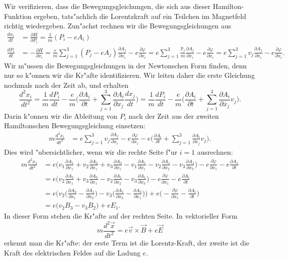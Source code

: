Wir verifizieren, dass die Bewegungsgleichungen, die sich aus dieser
Hamilton-Funktion ergeben, tats"achlich die Lorentzkraft auf ein
Teilchen im Magnetfeld richtig wiedergeben.
Zun"achst rechnen wir die Bewegungsgleichungen aus
\begin{align*}
\frac{dx_i}{dt}
&=
\frac{\partial H}{\partial P_i}
=
\frac1m(P_i-eA_i)
\\
\frac{dP_i}{dt}
&=
-\frac{\partial H}{\partial x_i}
=
\frac{e}{m}\sum_{j=1}^3( P_j-eA_j)\frac{\partial A_j}{\partial x_i}
-e\frac{\partial\varphi}{\partial x_i}
=
e\sum_{j=1}^3\frac{p_j}{m}\frac{\partial A_j}{\partial x_i}
-e\frac{\partial\varphi}{\partial x_i}
=
e\sum_{j=1}^3v_j\frac{\partial A_j}{\partial x_i}
-e\frac{\partial\varphi}{\partial x_i}.
\end{align*}
Wir m"ussen die Bewegungsgleichungen in der Newtonschen Form 
finden, denn nur so k"onnen wir die Kr"afte identifizieren.
Wir leiten daher die erste Gleichung nochmals nach der Zeit ab,
und erhalten
\[
\frac{d^2 x_i}{dt^2}
=
\frac1m\frac{dP_i}{dt}-\frac{e}{m}\biggl(
\frac{\partial A_i}{\partial t}
+\sum_{j=1}^3\frac{\partial A_i}{\partial x_j}\frac{dx_j}{dt}
\biggr)
=
\frac1m\frac{dP_i}{dt}-\frac{e}{m}\biggl(
\frac{\partial A_i}{\partial t}
+
\sum_{j=1}^3\frac{\partial A_i}{\partial x_j}v_j
\biggr).
\]
Darin k"onnen wir die Ableitung von $P_i$ nach der Zeit aus der
zweiten Hamiltonschen Bewegungsgleichung einsetzen:
\begin{align*}
m\frac{d^2 x_i}{dt^2}
&=
e\sum_{j=1}^3v_j\frac{\partial A_j}{\partial x_i}
-e\frac{\partial\varphi}{\partial x_i}
-
e\biggl(
\frac{\partial A_i}{\partial t}
+\sum_{j=1}^3\frac{\partial A_i}{\partial x_j}v_j
\biggr).
\end{align*}
Dies wird "ubersichtlicher, wenn wir die rechte Seite f"ur $i=1$
ausrechnen:
\begin{align*}
m\frac{d^2 x_1}{dt^2}
&=
e\biggl(
v_1\frac{\partial A_1}{\partial x_1}
+
v_2\frac{\partial A_2}{\partial x_1}
+
v_3\frac{\partial A_3}{\partial x_1}
-
v_1\frac{\partial A_1}{\partial x_1}
-
v_2\frac{\partial A_1}{\partial x_2}
-
v_3\frac{\partial A_1}{\partial x_3}
\biggr)
-e\frac{\partial\varphi}{\partial x_1}
-e\frac{\partial A_1}{\partial t}
\\
&=
e\biggl(
v_2\frac{\partial A_2}{\partial x_1}
+
v_3\frac{\partial A_3}{\partial x_1}
-
v_2\frac{\partial A_1}{\partial x_2}
-
v_3\frac{\partial A_1}{\partial x_3}
\biggr)
-e\frac{\partial\varphi}{\partial x_1}
-e\frac{\partial A_i}{\partial t}
\\
&=
e\biggl(
v_2
\biggl(
\frac{\partial A_2}{\partial x_1}
-
\frac{\partial A_1}{\partial x_2}
\biggr)
-
v_3\biggr(
\frac{\partial A_1}{\partial x_3}
-
\frac{\partial A_3}{\partial x_1}
\biggr)
\biggr)
+e\biggl(
-\frac{\partial\varphi}{\partial x_1}
-\frac{\partial A_i}{\partial t}
\biggr)
\\
&=
e\biggl(
v_2B_3
-
v_3B_2
\biggr)
+eE_1.
\end{align*}
In dieser Form stehen die Kr"afte auf der rechten Seite. 
In vektorieller Form
\[
m\frac{d^2\vec x}{dt^2}
=
e\vec v\times\vec B
+e\vec E
\]
erkennt man die Kr"afte: der erste Term ist die Lorentz-Kraft,
der zweite ist die Kraft des elektrischen Feldes auf die Ladung $e$.

